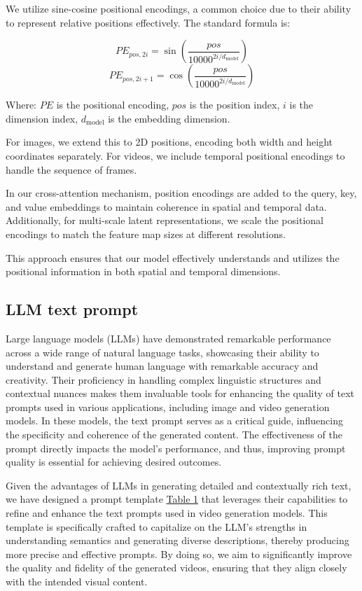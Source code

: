 We utilize sine-cosine positional encodings, a common choice due to their ability to represent relative positions effectively. The standard formula is:

\[PE_{pos, 2i} = \sin\left( \frac{pos}{10000^{2i/d_{\text{model}}}} \right)\]\[
PE_{pos, 2i+1} = \cos\left( \frac{pos}{10000^{2i/d_{\text{model}}}} \right)\]

Where:
    \( PE \) is the positional encoding,
    \( pos \) is the position index,
    \( i \) is the dimension index,
    \( d_{\text{model}} \) is the embedding dimension.

For images, we extend this to 2D positions, encoding both width and height coordinates separately. For videos, we include temporal positional encodings to handle the sequence of frames.

In our cross-attention mechanism, position encodings are added to the query, key, and value embeddings to maintain coherence in spatial and temporal data. Additionally, for multi-scale latent representations, we scale the positional encodings to match the feature map sizes at different resolutions.

This approach ensures that our model effectively understands and utilizes the positional information in both spatial and temporal dimensions.

\subsection{LLM text prompt}
Large language models (LLMs) have demonstrated remarkable performance across a wide range of natural language tasks, showcasing their ability to understand and generate human language with remarkable accuracy and creativity. Their proficiency in handling complex linguistic structures and contextual nuances makes them invaluable tools for enhancing the quality of text prompts used in various applications, including image and video generation models. In these models, the text prompt serves as a critical guide, influencing the specificity and coherence of the generated content. The effectiveness of the prompt directly impacts the model's performance, and thus, improving prompt quality is essential for achieving desired outcomes.

Given the advantages of LLMs in generating detailed and contextually rich text, we have designed a prompt template \hyperref[LLM_text_prompt]{Table 1} that leverages their capabilities to refine and enhance the text prompts used in video generation models. This template is specifically crafted to capitalize on the LLM's strengths in understanding semantics and generating diverse descriptions, thereby producing more precise and effective prompts. By doing so, we aim to significantly improve the quality and fidelity of the generated videos, ensuring that they align closely with the intended visual content.


